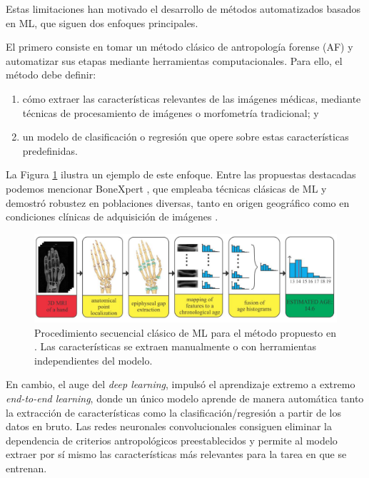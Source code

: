 Estas limitaciones han motivado el desarrollo de métodos automatizados basados en ML, que siguen dos enfoques
principales. 

El primero consiste en tomar un método clásico de antropología forense (AF) y automatizar sus 
etapas mediante herramientas computacionales. Para ello, el método debe definir:

\begin{enumerate}
    
    \item cómo extraer las características relevantes de las imágenes médicas, mediante técnicas de 
    procesamiento de imágenes o morfometría tradicional; y

    \item un modelo de clasificación o regresión que opere sobre estas características predefinidas.

\end{enumerate}

La Figura \ref{fig:MRI_pipeline} ilustra un ejemplo de este enfoque. Entre las propuestas destacadas 
podemos mencionar BoneXpert \cite{thodberg2008}, que empleaba técnicas clásicas de ML y demostró robustez 
en poblaciones diversas, tanto en origen geográfico como en condiciones clínicas de adquisición de 
imágenes \cite{van2009, martin2010, thodberg2010}. 

\begin{figure}[h]
    \centering
    \includegraphics[width=\textwidth]{capitulos/cap_01/imagenes/MRI_pipeline.png}
    \caption[
        Procedimiento secuencial clásico de ML para el método propuesto en \cite{stern2014}.
    ]{
        Procedimiento secuencial clásico de ML para el método propuesto en \cite{stern2014}. 
        Las características se extraen manualmente o con herramientas independientes del modelo.
    }
    \label{fig:MRI_pipeline}
\end{figure}

En cambio, el auge del \textit{deep learning}, impulsó el aprendizaje extremo a extremo 
\textit{end-to-end learning}, donde un único modelo aprende de manera automática tanto la extracción de 
características como la clasificación/regresión a partir de los 
datos en bruto. Las redes neuronales convolucionales consiguen eliminar la dependencia de criterios 
antropológicos preestablecidos y permite al modelo extraer por sí mismo las 
características más relevantes para la tarea en que se entrenan. 

